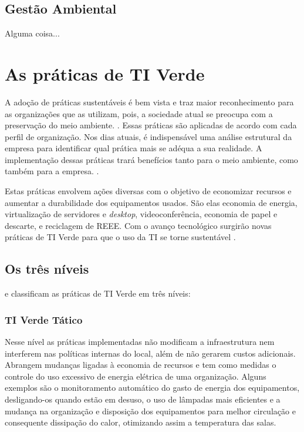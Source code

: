 \subsection{Gestão Ambiental}

Alguma coisa...

\section{As práticas de TI Verde}


A adoção de práticas sustentáveis é bem vista e traz maior reconhecimento para as organizações que as utilizam, pois, a sociedade atual se preocupa com a preservação do meio ambiente. \cite{abreu2012ti}. Essas práticas são aplicadas de acordo com cada perfil de organização. Nos dias atuais, é indispensável uma análise estrutural da empresa para identificar qual prática mais se adéqua a sua realidade. A implementação dessas práticas trará benefícios tanto para o meio ambiente, como também para a empresa. \cite{pinto2011estudo}.

Estas práticas envolvem ações diversas com o objetivo de economizar recursos e aumentar a durabilidade dos equipamentos usados.  São elas economia de energia, virtualização de servidores e \textit{desktop}, videoconferência, economia de papel e descarte, e reciclagem de REEE. Com o avanço tecnológico surgirão novas práticas de TI Verde para que o uso da TI se torne sustentável \cite[p. 8]{pinto2011estudo}.

\subsection{Os três níveis}

 e  classificam as práticas de TI Verde em três níveis:

\subsubsection{TI Verde Tático}

Nesse nível as práticas implementadas não modificam a infraestrutura nem interferem nas políticas internas do local, além de não gerarem custos adicionais. Abrangem mudanças ligadas à economia de recursos e tem como medidas o controle do uso excessivo de energia elétrica de uma organização. Alguns exemplos são o monitoramento automático do gasto de energia dos equipamentos, desligando-os quando estão em desuso, o uso de lâmpadas mais eficientes e a mudança na organização e disposição dos equipamentos para melhor circulação e consequente dissipação do calor, otimizando assim a temperatura das salas.

